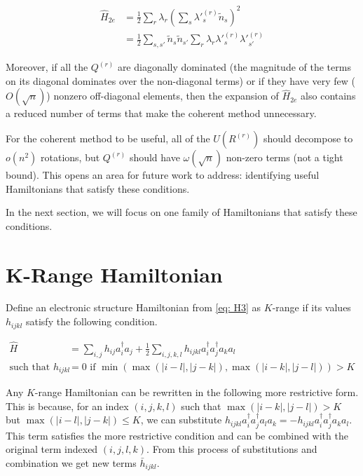 \begin{equation}
    \begin{split}
        \hat{H}_{2e} &= \frac{1}{2}\sum_r\lambda_r\left(\sum_s \lambda'^{(r)}_s \tilde{n}_s\right)^2 \\
        &= \frac{1}{2}\sum_{s, s'} \tilde{n}_s\tilde{n}_{s'}\sum_r\lambda_r\lambda'^{(r)}_s\lambda'^{(r)}_{s'}
    \end{split}
    \label{eq: collapse2}
\end{equation}

Moreover, if all the $Q^{(r)}$ are diagonally dominated (the magnitude of the terms on its diagonal dominates over the non-diagonal terms) or if they have very few ($O(\sqrt{n})$) nonzero off-diagonal elements, then the expansion of $\hat{H}_{2e}$ also contains a reduced number of terms that make the coherent method unnecessary.

For the coherent method to be useful, all of the $U(R^{(r)})$ should decompose to $o(n^2)$ rotations, but $Q^{(r)}$ should have $\omega(\sqrt{n})$ non-zero terms (not a tight bound). This opens an area for future work to address: identifying useful Hamiltonians that satisfy these conditions.

In the next section, we will focus on one family of Hamiltonians that satisfy these conditions.



\section{K-Range Hamiltonian}

Define an electronic structure Hamiltonian from \eqref{eq: H3} as $K$-range if its values $h_{ijkl}$ satisfy the following condition.

\begin{equation}
    \begin{split}
        \hat{H} &= \sum_{i, j} h_{ij}a^\dag_ia_j + \frac{1}{2}\sum_{i,j,k,l} h_{ijkl}a^\dag_ia^\dag_ja_ka_l  \\
        \text{such that } h_{ijkl} &= 0 \text{ if } \min(\max(|i - l|, |j - k|), \max(|i - k|, |j - l|)) > K
    \end{split}
\end{equation}

Any $K$-range Hamiltonian can be rewritten in the following more restrictive form. This is because, for an index $(i, j, k, l)$ such that $\max(|i - k|, |j - l|) > K$ but $\max(|i - l|, |j - k|) \leq K$, we can substitute $h_{ijkl}a^\dag_ia^\dag_ja_la_k = -h_{ijkl}a^\dag_ia^\dag_ja_ka_l$. This term satisfies the more restrictive condition and can be combined with the original term indexed $(i, j, l, k)$. From this process of substitutions and combination we get new terms $\bar{h}_{ijkl}$.

